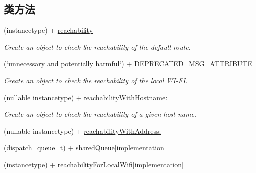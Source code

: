 \subsection*{类方法}
\begin{DoxyCompactItemize}
\item 
(instancetype) + \hyperlink{interface_m_a_r_reachability_ad46b6909f162c589339d3a22b72d056d}{reachability}
\begin{DoxyCompactList}\small\item\em Create an object to check the reachability of the default route. \end{DoxyCompactList}\item 
(\char`\"{}unnecessary and potentially harmful\char`\"{}) + \hyperlink{interface_m_a_r_reachability_a52766c60081736ecc8b4217c4ebd503a}{D\+E\+P\+R\+E\+C\+A\+T\+E\+D\+\_\+\+M\+S\+G\+\_\+\+A\+T\+T\+R\+I\+B\+U\+TE}
\begin{DoxyCompactList}\small\item\em Create an object to check the reachability of the local W\+I-\/\+FI. \end{DoxyCompactList}\item 
(nullable instancetype) + \hyperlink{interface_m_a_r_reachability_a51361d8879b07756e6606da49af4a2a7}{reachability\+With\+Hostname\+:}
\begin{DoxyCompactList}\small\item\em Create an object to check the reachability of a given host name. \end{DoxyCompactList}\item 
(nullable instancetype) + \hyperlink{interface_m_a_r_reachability_abf53893fed79ab36e7e1d439a7763226}{reachability\+With\+Address\+:}
\item 
(dispatch\+\_\+queue\+\_\+t) + \hyperlink{interface_m_a_r_reachability_a48b584d6d0261105cb2d5c4e50158833}{shared\+Queue}{\ttfamily  \mbox{[}implementation\mbox{]}}
\item 
(instancetype) + \hyperlink{interface_m_a_r_reachability_a706357e0b7f514d9604406ee6b9a485d}{reachability\+For\+Local\+Wifi}{\ttfamily  \mbox{[}implementation\mbox{]}}
\end{DoxyCompactItemize}
